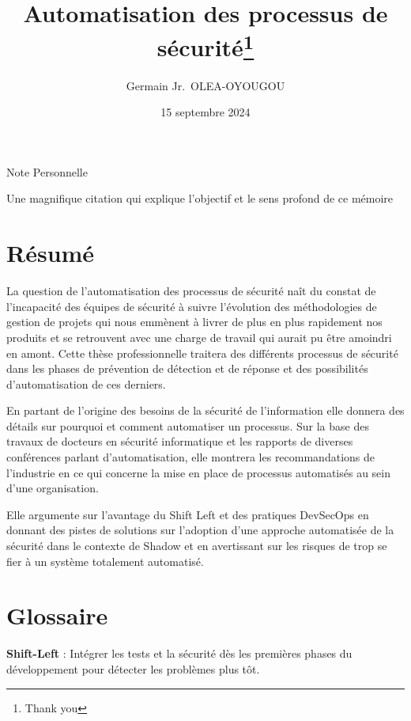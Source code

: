 \documentclass[
  11pt,
  a4paper,
  krantz2,
  11pt,
  oneside]{krantz}
\title{Automatisation des processus de sécurité\thanks{Thank you}}
\author{Germain Jr.~OLEA-OYOUGOU}
\date{15 septembre 2024}
\begin{document}
\maketitle

\thispagestyle{empty}
\begin{center}
\Large{Note Personnelle}

\large{Une magnifique citation qui explique l'objectif et le sens profond de ce mémoire}
\end{center}

\setlength{\abovedisplayskip}{-5pt}
\setlength{\abovedisplayshortskip}{-5pt}

{
\hypersetup{linkcolor=}
\setcounter{tocdepth}{2}
\tableofcontents
}
\listoffigures
\listoftables
\chapter{Résumé}\label{ruxe9sumuxe9}

La question de l'automatisation des processus de sécurité naît du constat de l'incapacité des équipes de sécurité à suivre l'évolution des méthodologies de gestion de projets qui nous emmènent à livrer de plus en plus rapidement nos produits et se retrouvent avec une charge de travail qui aurait pu être amoindri en amont. Cette thèse professionnelle traitera des différents processus de sécurité dans les phases de prévention de détection et de réponse et des possibilités d'automatisation de ces derniers.

En partant de l'origine des besoins de la sécurité de l'information elle donnera des détails sur pourquoi et comment automatiser un processus. Sur la base des travaux de docteurs en sécurité informatique et les rapports de diverses conférences parlant d'automatisation, elle montrera les recommandations de l'industrie en ce qui concerne la mise en place de processus automatisés au sein d'une organisation.

Elle argumente sur l'avantage du Shift Left et des pratiques DevSecOps en donnant des pistes de solutions sur l'adoption d'une approche automatisée de la sécurité dans le contexte de Shadow et en avertissant sur les risques de trop se fier à un système totalement automatisé.

\chapter{Glossaire}\label{glossaire}

\textbf{Shift-Left} : Intégrer les tests et la sécurité dès les premières phases du développement pour détecter les problèmes plus tôt.
\end{document}
